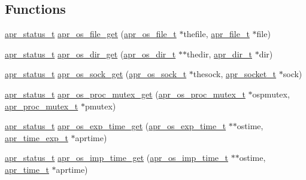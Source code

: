 \subsection*{Functions}
\begin{DoxyCompactItemize}
\item 
\hyperlink{group__apr__errno_gaf76ee4543247e9fb3f3546203e590a6c}{apr\-\_\-status\-\_\-t} \hyperlink{group__apr__portabile_ga1ff9a9a7313954fb6590f280d2c2e992}{apr\-\_\-os\-\_\-file\-\_\-get} (\hyperlink{group__apr__portabile_ga885491b889a4a719549650d3a370fd34}{apr\-\_\-os\-\_\-file\-\_\-t} $\ast$thefile, \hyperlink{group__apr__file__io_gaa46e4763ac375ea3c7a43ba6f6099e22}{apr\-\_\-file\-\_\-t} $\ast$file)
\item 
\hyperlink{group__apr__errno_gaf76ee4543247e9fb3f3546203e590a6c}{apr\-\_\-status\-\_\-t} \hyperlink{group__apr__portabile_ga99225bfab137069b9d5c5a72f863c577}{apr\-\_\-os\-\_\-dir\-\_\-get} (\hyperlink{group__apr__portabile_gacb790646cfc3da1b43a5f7c4bfaa3937}{apr\-\_\-os\-\_\-dir\-\_\-t} $\ast$$\ast$thedir, \hyperlink{group__apr__file__info_ga92ed8cf52cba2abb42cf74087aa74da8}{apr\-\_\-dir\-\_\-t} $\ast$dir)
\item 
\hyperlink{group__apr__errno_gaf76ee4543247e9fb3f3546203e590a6c}{apr\-\_\-status\-\_\-t} \hyperlink{group__apr__portabile_ga07ec79bbb5243596933cd2caf2d428df}{apr\-\_\-os\-\_\-sock\-\_\-get} (\hyperlink{group__apr__portabile_ga2965cd2e48cb6513bc0ba05aa6083ed7}{apr\-\_\-os\-\_\-sock\-\_\-t} $\ast$thesock, \hyperlink{group__apr__network__io_ga49262b223e7434746e1f1737659aa2c3}{apr\-\_\-socket\-\_\-t} $\ast$sock)
\item 
\hyperlink{group__apr__errno_gaf76ee4543247e9fb3f3546203e590a6c}{apr\-\_\-status\-\_\-t} \hyperlink{group__apr__portabile_ga2003a3142f05675696268053b2fddbe1}{apr\-\_\-os\-\_\-proc\-\_\-mutex\-\_\-get} (\hyperlink{structapr__os__proc__mutex__t}{apr\-\_\-os\-\_\-proc\-\_\-mutex\-\_\-t} $\ast$ospmutex, \hyperlink{group__apr__proc__mutex_ga0fae3a1ab686cd1f252c6062e4c97bd2}{apr\-\_\-proc\-\_\-mutex\-\_\-t} $\ast$pmutex)
\item 
\hyperlink{group__apr__errno_gaf76ee4543247e9fb3f3546203e590a6c}{apr\-\_\-status\-\_\-t} \hyperlink{group__apr__portabile_ga903df49f8cd2bb7298cb1612ff6394df}{apr\-\_\-os\-\_\-exp\-\_\-time\-\_\-get} (\hyperlink{group__apr__portabile_ga0fa9349212690591b09a0cbea7b61bdd}{apr\-\_\-os\-\_\-exp\-\_\-time\-\_\-t} $\ast$$\ast$ostime, \hyperlink{structapr__time__exp__t}{apr\-\_\-time\-\_\-exp\-\_\-t} $\ast$aprtime)
\item 
\hyperlink{group__apr__errno_gaf76ee4543247e9fb3f3546203e590a6c}{apr\-\_\-status\-\_\-t} \hyperlink{group__apr__portabile_ga406db611360a70360bec953cd92d2df7}{apr\-\_\-os\-\_\-imp\-\_\-time\-\_\-get} (\hyperlink{group__apr__portabile_ga6d27e476300cd1d3fda24e1ff0e358e1}{apr\-\_\-os\-\_\-imp\-\_\-time\-\_\-t} $\ast$$\ast$ostime, \hyperlink{group__apr__time_gadb4bde16055748190eae190c55aa02bb}{apr\-\_\-time\-\_\-t} $\ast$aprtime)
$$
\end{DoxyCompactItemize}
